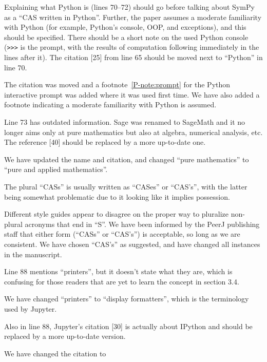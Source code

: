 \documentclass[answers,12pt]{exam}
\begin{document}
\begin{questions}

\question Explaining what Python is (lines 70--72) should go before talking about SymPy as a ``CAS written in Python''. Further, the paper assumes a moderate familiarity with Python (for example, Python's console, OOP, and exceptions), and this should be specified. There should be a short note on the used Python console (\verb|>>>| is the prompt, with the results of computation following immediately in the lines after it). The citation [25] from line 65 should be moved next to ``Python'' in line 70.
\begin{solution}
The citation was moved and a footnote~\ref{P-note:prompt} for the Python interactive prompt was
  added where it was used first time. We have also added a footnote indicating
  a moderate familiarity with Python is assumed.
\end{solution}

\question Line 73 has outdated information. Sage was renamed to SageMath and it no longer aims only at pure mathematics but also at algebra, numerical analysis, etc. The reference [40] should be replaced by a more up-to-date one.
\begin{solution}
We have updated the name and citation, and changed ``pure mathematics'' to
``pure and applied mathematics''.
\end{solution}

\question The plural ``CASs'' is usually written as ``CASes'' or ``CAS's'', with the latter being somewhat problematic due to it looking like it implies possession.
\begin{solution}
  Different style guides appear to disagree on the proper way to pluralize
  non-plural acronyms that end in ``S''. We have been informed by the PeerJ
  publishing staff that either form (``CASs'' or ``CAS's'') is acceptable, so
  long as we are consistent. We have chosen ``CAS's'' as suggested, and have
  changed all instances in the manuscript.
\end{solution}

\question Line 88 mentions ``printers'', but it doesn't state what they are, which is confusing for those readers that are yet to learn the concept in section 3.4.
\begin{solution}
We have changed ``printers'' to ``display formatters'', which is the
terminology used by Jupyter.
\end{solution}

\question Also in line 88, Jupyter's citation [30] is actually about IPython and should be replaced by a more up-to-date version.
\begin{solution}
We have changed the citation to


\end{solution}
\end{questions}
\end{document}
